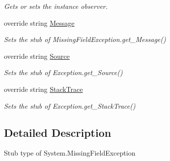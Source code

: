 \begin{DoxyCompactItemize}
\begin{DoxyCompactList}\small\item\em Gets or sets the instance observer.\end{DoxyCompactList}\item 
override string \hyperlink{class_system_1_1_fakes_1_1_stub_missing_field_exception_ac3acaf09894615322e7cd303de1b55f3}{Message}
\begin{DoxyCompactList}\small\item\em Sets the stub of Missing\-Field\-Exception.\-get\-\_\-\-Message()\end{DoxyCompactList}\item 
override string \hyperlink{class_system_1_1_fakes_1_1_stub_missing_field_exception_a2bdfedfa53df4a16e8d9d125276905ad}{Source}
\begin{DoxyCompactList}\small\item\em Sets the stub of Exception.\-get\-\_\-\-Source()\end{DoxyCompactList}\item 
override string \hyperlink{class_system_1_1_fakes_1_1_stub_missing_field_exception_ab85c3bedc96ed14c187b3a599b74ecaf}{Stack\-Trace}
\begin{DoxyCompactList}\small\item\em Sets the stub of Exception.\-get\-\_\-\-Stack\-Trace()\end{DoxyCompactList}\end{DoxyCompactItemize}


\subsection{Detailed Description}
Stub type of System.\-Missing\-Field\-Exception



